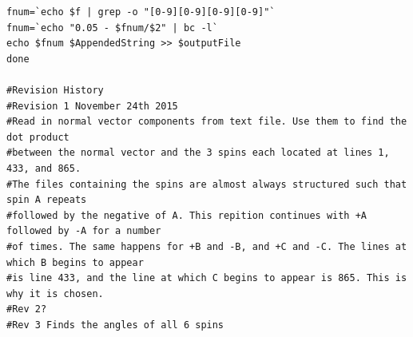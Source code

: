 \documentclass{article}
\begin{document}
\begin{lstlisting}
fnum=`echo $f | grep -o "[0-9][0-9][0-9][0-9]"`
fnum=`echo "0.05 - $fnum/$2" | bc -l` 
echo $fnum $AppendedString >> $outputFile
done

#Revision History
#Revision 1 November 24th 2015
#Read in normal vector components from text file. Use them to find the dot product
#between the normal vector and the 3 spins each located at lines 1, 433, and 865.
#The files containing the spins are almost always structured such that spin A repeats
#followed by the negative of A. This repition continues with +A followed by -A for a number
#of times. The same happens for +B and -B, and +C and -C. The lines at which B begins to appear
#is line 433, and the line at which C begins to appear is 865. This is why it is chosen. 
#Rev 2?
#Rev 3 Finds the angles of all 6 spins

\end{lstlisting}
\end{document}
